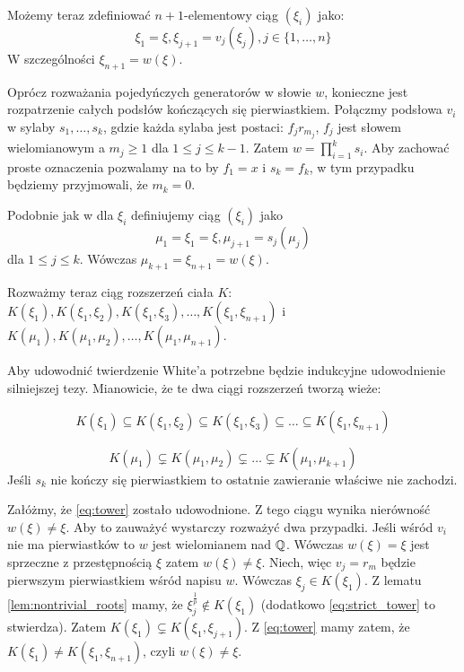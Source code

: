 Możemy teraz zdefiniować $n+1$-elementowy ciąg $\left(\xi_i\right)$ jako:
\[\xi_1 = \xi, \xi_{j+1} = v_j\left(\xi_j\right), j \in \{1, \ldots, n\}\]
W szczególności $\xi_{n+1} = w(\xi)$.

Oprócz rozważania pojedyńczych generatorów w słowie $w$, konieczne jest
rozpatrzenie całych podsłów kończących się pierwiastkiem. Połączmy podsłowa
$v_i$ w sylaby $s_1, \ldots, s_k$, gdzie każda sylaba jest postaci:
$f_jr_{m_j}$, $f_j$ jest słowem wielomianowym a $m_j \geq 1$ dla
$1 \leq j \leq k-1$. Zatem $w = \prod_{i=1}^k s_i$.
Aby zachować proste oznaczenia pozwalamy na to by $f_1 = x$  i $s_k = f_k$, w
tym przypadku będziemy przyjmowali, że $m_k = 0$.

Podobnie jak w dla $\xi_i$ definiujemy ciąg $\left(\xi_i\right)$ jako
\[\mu_1 = \xi_1 = \xi, \mu_{j+1} = s_j\left(\mu_j\right)\]
dla $1 \leq j \leq k$. Wówczas $\mu_{k+1} = \xi_{n+1} = w(\xi)$.

Rozważmy teraz ciąg rozszerzeń ciała $K$:
$
K\left(\xi_1\right),
K\left(\xi_1, \xi_2\right),
K\left(\xi_1, \xi_3\right),
\ldots,
K\left(\xi_1, \xi_{n+1}\right)$ i
$
K\left(\mu_1\right),
K\left(\mu_1, \mu_2\right),
\ldots,
K\left(\mu_1, \mu_{n+1}\right)$.

Aby udowodnić twierdzenie White'a potrzebne będzie indukcyjne udowodnienie
silniejszej tezy. Mianowicie, że te dwa ciągi rozszerzeń tworzą wieże:

\begin{equation}
K\left(\xi_1\right) \subseteq
K\left(\xi_1, \xi_2\right) \subseteq
K\left(\xi_1, \xi_3\right) \subseteq
\ldots
\subseteq
K\left(\xi_1, \xi_{n+1}\right)
\label{eq:tower}
\end{equation}

\begin{equation}
  K(\mu_1) \subsetneq
  K(\mu_1, \mu_2) \subsetneq
  \ldots \subsetneq
  K(\mu_1, \mu_{k+1})
  \label{eq:strict_tower}
\end{equation}
Jeśli $s_k$ nie kończy się pierwiastkiem to ostatnie zawieranie właściwe nie
zachodzi.

Załóżmy, że \ref{eq:tower} zostało udowodnione. Z tego ciągu wynika nierówność
$w\left(\xi\right) \neq \xi$. Aby to zauważyć wystarczy rozważyć dwa przypadki.
Jeśli wśród $v_i$ nie ma pierwiastków to $w$ jest wielomianem nad $\mathbb{Q}$. Wówczas
$w(\xi) = \xi$ jest sprzeczne z przestępnością $\xi$ zatem $w(\xi) \neq \xi$.
Niech, więc $v_j = r_m$ będzie pierwszym pierwiastkiem wśród napisu $w$. Wówczas
$\xi_j \in K\left(\xi_1\right)$. Z lematu \ref{lem:nontrivial_roots} mamy, że
$\xi_{j}^{\frac{1}{p}} \not \in K(\xi_1)$ (dodatkowo \ref{eq:strict_tower} to
stwierdza). Zatem $K\left(\xi_1\right) \subsetneq K\left(\xi_1,
\xi_{j+1}\right)$. Z \ref{eq:tower} mamy zatem, że $K\left(\xi_1\right) \neq
K\left(\xi_1, \xi_{n+1}\right)$, czyli $w(\xi) \neq \xi$.

